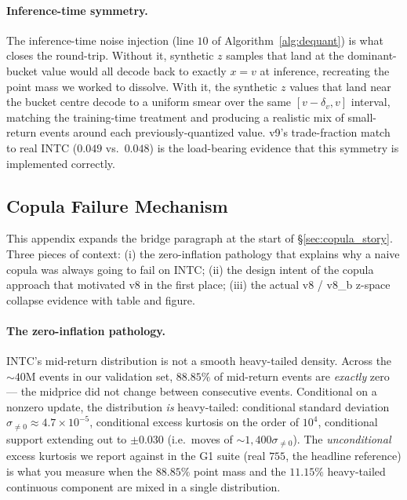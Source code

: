 \documentclass[journal]{IEEEtran}
\theoremstyle{definition}   %
\begin{document}
\paragraph{Inference-time symmetry.}
The inference-time noise injection (line $10$ of
Algorithm~\ref{alg:dequant}) is what closes the round-trip. Without
it, synthetic $z$ samples that land at the dominant-bucket value
would all decode back to exactly $x = v$ at inference, recreating
the point mass we worked to dissolve. With it, the synthetic
$z$ values that land near the bucket centre decode to a uniform
smear over the same $[v - \delta_v, v]$ interval, matching the
training-time treatment and producing a realistic mix of
small-return events around each previously-quantized value. v9's
trade-fraction match to real INTC ($0.049$ vs.\ $0.048$) is the
load-bearing evidence that this symmetry is implemented correctly.

\subsection{Copula Failure Mechanism}
\label{app:copula_mechanism}

This appendix expands the bridge paragraph at the start of
\S\ref{sec:copula_story}. Three pieces of context: (i) the
zero-inflation pathology that explains why a naive copula was
always going to fail on INTC; (ii) the design intent of the copula
approach that motivated v8 in the first place; (iii) the actual
v8 / v8\_b z-space collapse evidence with table and figure.

\paragraph{The zero-inflation pathology.}
INTC's mid-return distribution is not a smooth heavy-tailed
density. Across the $\sim 40$M events in our validation set,
$88.85\%$ of mid-return events are \emph{exactly} zero --- the
midprice did not change between consecutive events. Conditional on
a nonzero update, the distribution \emph{is} heavy-tailed:
conditional standard deviation $\sigma_{\neq 0} \approx
4.7\times 10^{-5}$, conditional excess kurtosis on the order of
$10^4$, conditional support extending out to $\pm 0.030$ (i.e.\
moves of $\sim 1{,}400\sigma_{\neq 0}$). The \emph{unconditional}
excess kurtosis we report against in the G1 suite (real $755$,
the headline reference) is what you measure when the $88.85\%$
point mass and the $11.15\%$ heavy-tailed continuous component are
mixed in a single distribution.
\end{document}
